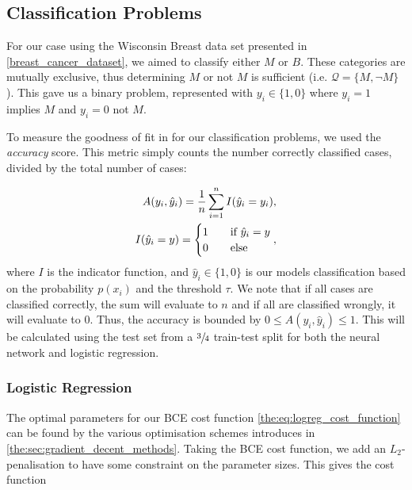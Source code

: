 \subsection{Classification Problems}
    For our case using the Wisconsin Breast data set presented in \cref{breast_cancer_dataset}, we aimed to classify either $M$ or $B$. These categories are mutually exclusive, thus determining $M$ or not $M$ is sufficient (i.e. $\mathcal{Q} = \{ M, \neg M \}$). This gave us a binary problem, represented with $y_i \in \{ 1, 0 \}$ where $y_i = 1$ implies $M$ and $y_i = 0$ not $M$.

    To measure the goodness of fit in for our classification problems, we used the \textit{accuracy} score. This metric simply counts the number correctly classified cases, divided by the total number of cases:

    \begin{align}
        A(y_i, \hat{y}_i) = \frac{1}{n}\sum_{i=1}^{n} I(\hat{y}_i = y_i), \\
        I(\hat{y}_i = y) = \begin{cases}
            1\hspace{10px}&\text{if }\hat{y}_i = y \\
            0\hspace{10px}&\text{else}
        \end{cases} \nonumber,
    \end{align}
    where $I$ is the indicator function, and $\hat{y}_i \in \{ 1, 0\}$ is our models classification based on the probability $p(x_i)$ and the threshold $\tau$. We note that if all cases are classified correctly, the sum will evaluate to $n$ and if all are classified wrongly, it will evaluate to 0. Thus, the accuracy is bounded by $0 \leq A(y_i, \hat{y}_i) \leq 1$. This will be calculated using the test set from a $\sfrac{3}{4}$ train-test split for both the neural network and logistic regression.

    \subsubsection{Logistic Regression}
    The optimal parameters for our BCE cost function \cref{the:eq:logreg_cost_function} can be found by the various optimisation schemes introduces in \cref{the:sec:gradient_decent_methods}. Taking the BCE cost function, we add an $L_2$-penalisation to have some constraint on the parameter sizes. This gives the cost function

